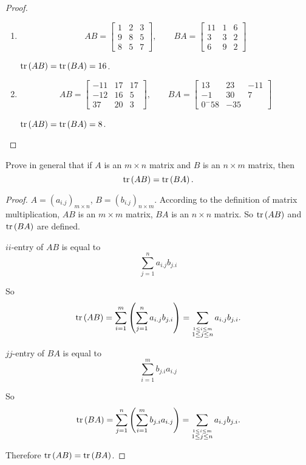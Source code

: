 \begin{proof}
    \begin{enumerate}[label={(\alph*)}]
        \item
              \[
                  AB = \begin{bmatrix}
                      1 & 2 & 3 \\
                      9 & 8 & 5 \\
                      8 & 5 & 7
                  \end{bmatrix},\qquad
                  BA = \begin{bmatrix}
                      11 & 1 & 6 \\
                      3  & 3 & 2 \\
                      6  & 9 & 2
                  \end{bmatrix}
              \]

              $\text{tr}\left({AB}\right) = \text{tr}\left({BA}\right) = 16$.
        \item
              \[
                  AB = \begin{bmatrix}
                      -11 & 17 & 17 \\
                      -12 & 16 & 5  \\
                      37  & 20 & 3
                  \end{bmatrix},\qquad
                  BA = \begin{bmatrix}
                      13       & 23  & -11 \\
                      -1       & 30  & 7   \\
                      0  ^ -58 & -35
                  \end{bmatrix}
              \]

              $\text{tr}\left({AB}\right) = \text{tr}\left({BA}\right) = 8$.
    \end{enumerate}
\end{proof}

\begin{exercise}
    Prove in general that if $A$ is an $m\times n$ matrix and $B$ is an $n\times m$ matrix, then
    \[
        \text{tr}\left({AB}\right) = \text{tr}\left({BA}\right).
    \]
\end{exercise}

\begin{proof}
    $A = {(a_{i.j})}_{m\times n}$, $B = {(b_{i.j})}_{n\times m}$. According to the definition of matrix multiplication, $AB$ is an $m\times m$ matrix, $BA$ is an $n\times n$ matrix. So $\text{tr}\left({AB}\right)$ and $\text{tr}\left({BA}\right)$ are defined.

    $ii$-entry of $AB$ is equal to
    \[
        \sum^{n}_{j=1}a_{i.j}b_{j.i}
    \]

    So
    \[
        \text{tr}\left({AB}\right) = \sum^{m}_{i=1}\left(\sum^{n}_{j=1}a_{i.j}b_{j.i}\right) = \sum_{\stackrel{1\le i\le m}{1\le j\le n}}a_{i.j}b_{j.i}.
    \]

    $jj$-entry of $BA$ is equal to
    \[
        \sum^{m}_{i=1}b_{j.i}a_{i.j}
    \]

    So
    \[
        \text{tr}\left({BA}\right) = \sum^{n}_{j=1}\left(\sum^{m}_{i=1}b_{j.i}a_{i.j}\right) = \sum_{\stackrel{1\le i\le m}{1\le j\le n}}a_{i.j}b_{j.i}.
    \]

    Therefore $\text{tr}\left({AB}\right) = \text{tr}\left({BA}\right)$.
\end{proof}

